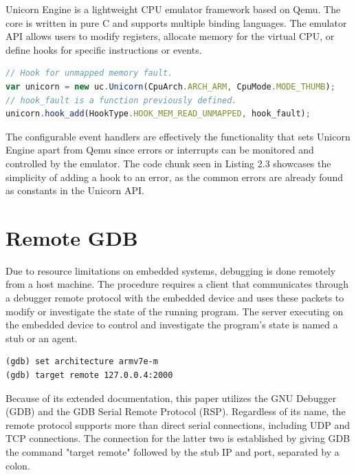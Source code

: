 \documentclass[12pt,a4paper]{report}
\begin{document}
Unicorn Engine is a lightweight CPU emulator framework based on Qemu. The core is written in pure C and supports multiple binding languages. The emulator API allows users to modify registers, allocate memory for the virtual CPU, or define hooks for specific instructions or events.

\begin{lstlisting}[caption=Memory fault hook using Unicorn.js\protect\footnotemark,label={lst:unicorn-mem-fault},language=JavaScript]
// Hook for unmapped memory fault.
var unicorn = new uc.Unicorn(CpuArch.ARCH_ARM, CpuMode.MODE_THUMB);
// hook_fault is a function previously defined.
unicorn.hook_add(HookType.HOOK_MEM_READ_UNMAPPED, hook_fault); 
\end{lstlisting}

The configurable event handlers are effectively the functionality that sets Unicorn Engine apart from Qemu since errors or interrupts
can be monitored and controlled by the emulator. The code chunk seen in Listing 2.3 showcases the simplicity of adding a hook to an error, as the common errors are already found as constants in the Unicorn API.


\section{Remote GDB}

Due to resource limitations on embedded systems, debugging is done remotely from a host machine. The procedure requires a client that communicates through a debugger remote protocol with the embedded device and uses these packets to modify or investigate the state of the running program. The server executing on the embedded device to control and investigate the program's state is named a stub or an agent.

\begin{lstlisting}[caption=Initiating a remote connection on GDB,language=GDB]
(gdb) set architecture armv7e-m
(gdb) target remote 127.0.0.4:2000
\end{lstlisting}

Because of its extended documentation, this paper utilizes the GNU Debugger (GDB) and the GDB Serial Remote Protocol (RSP). Regardless of its name, the remote protocol supports more than direct serial connections, including UDP and TCP connections. The connection for the latter two is established by giving GDB the command "target remote" followed by the stub IP and port, separated by a colon.
\end{document}
